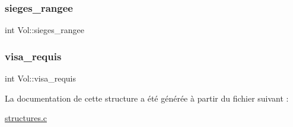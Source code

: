 \subsubsection{\texorpdfstring{sieges\+\_\+rangee}{sieges\_rangee}}
{\footnotesize\ttfamily int Vol\+::sieges\+\_\+rangee}

\mbox{\label{structVol_a3995b340d68374bb5c7610735d5488d3}} 
\subsubsection{\texorpdfstring{visa\+\_\+requis}{visa\_requis}}
{\footnotesize\ttfamily int Vol\+::visa\+\_\+requis}



La documentation de cette structure a été générée à partir du fichier suivant \+:\begin{DoxyCompactItemize}
\item 
\hyperlink{structures_8c}{structures.\+c}\end{DoxyCompactItemize}
